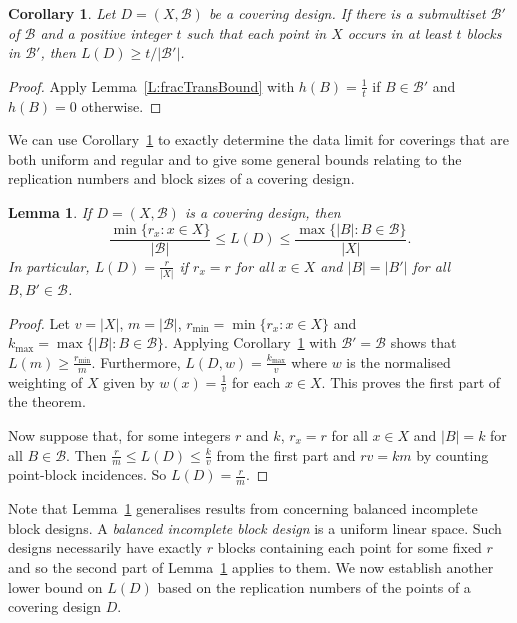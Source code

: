 \documentclass[11pt]{article}
\newtheorem{Lemma}[Theorem]{Lemma}
\newtheorem{Corollary}[Theorem]{Corollary}
\theoremstyle{definition}
\renewcommand{\leq}{\leqslant}
\renewcommand{\geq}{\geqslant}
\newcommand{\B}{{\ensuremath{\mathcal{B}}}}
\begin{document}
\begin{Corollary}\label{C:fracTransCor}
Let $D=(X,\B)$ be a covering design. If there is a submultiset $\B'$ of $\B$ and a positive integer $t$ such that each point in $X$ occurs in at least $t$ blocks in $\B'$, then $L(D) \geq t/|\B'|$.
\end{Corollary}

\begin{proof}
Apply Lemma~\ref{L:fracTransBound} with $h(B)=\frac{1}{t}$ if $B \in \B'$ and $h(B)=0$ otherwise.
\end{proof}


We can use Corollary~\ref{C:fracTransCor} to exactly determine the data limit for coverings that are both uniform and regular and to give some general bounds relating to the replication numbers and block sizes of a covering design.

\begin{Lemma}\label{L:rkBounds}
If $D=(X,\B)$ is a covering design, then
\[\frac{\min\{r_x:x\in X\}}{|\B|} \leq L(D) \leq \frac{\max\{|B|:B \in \B\}}{|X|}.\]
In particular, $L(D)=\frac{r}{|X|}$ if $r_x=r$ for all $x \in X$ and $|B|=|B'|$ for all $B,B' \in \B$.
\end{Lemma}

\begin{proof}
Let $v=|X|$, $m=|\B|$, $r_{\min}=\min\{r_x:x\in X\}$ and $k_{\max}=\max\{|B|:B \in \B\}$. Applying Corollary~\ref{C:fracTransCor} with $\B'=\B$ shows that $L(m) \geq \frac{r_{\min}}{m}$. Furthermore, $L(D,w) = \frac{k_{\max}}{v}$ where $w$ is the normalised weighting of $X$ given by $w(x)=\frac{1}{v}$ for each $x \in X$. This proves the first part of the theorem.

Now suppose that, for some integers $r$ and $k$, $r_x=r$ for all $x \in X$ and $|B|=k$ for all $B \in \B$. Then $\frac{r}{m} \leq L(D) \leq \frac{k}{v}$ from the first part and $rv=km$ by counting point-block incidences. So $L(D)=\frac{r}{m}$.
\end{proof}



Note that Lemma~\ref{L:rkBounds} generalises results from \cite{HalKelTia} concerning balanced incomplete block designs. A \emph{balanced incomplete block design} is a uniform linear space. Such designs necessarily have exactly $r$ blocks containing each point for some fixed $r$ and so the second part of Lemma~\ref{L:rkBounds} applies to them. We now establish another lower bound on $L(D)$ based on the replication numbers of the points of a covering design $D$.
\end{document}
